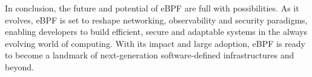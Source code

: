 In conclusion, the future and potential of eBPF are full with possibilities. 
As it evolves, eBPF is set to reshape networking, observability and security paradigms, enabling developers to build efficient, secure and adaptable systems in the always evolving world of computing. 
With its impact and large adoption, eBPF is ready to become a landmark of next-generation software-defined infrastructures and beyond.
